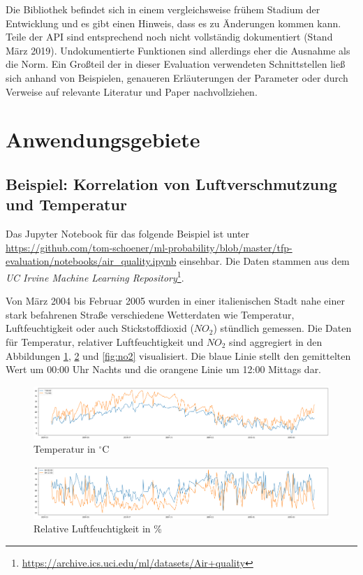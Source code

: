 \documentclass[12pt]{article}
\begin{document}
Die Bibliothek befindet sich in einem vergleichsweise frühem Stadium der Entwicklung und es gibt einen Hinweis, dass es zu Änderungen kommen kann. Teile der API sind entsprechend noch nicht vollständig dokumentiert (Stand März 2019).
Undokumentierte Funktionen sind allerdings eher die Ausnahme als die Norm. Ein Großteil der in dieser Evaluation verwendeten Schnittstellen ließ sich anhand von Beispielen, genaueren Erläuterungen der Parameter oder durch Verweise auf relevante Literatur und Paper nachvollziehen.

\section{Anwendungsgebiete}

\subsection{Beispiel: Korrelation von Luftverschmutzung und Temperatur}
\label{sec:example_air_quality}

Das Jupyter Notebook für das folgende Beispiel ist unter \url{https://github.com/tom-schoener/ml-probability/blob/master/tfp-evaluation/notebooks/air_quality.ipynb} einsehbar. Die Daten stammen aus dem \textit{UC Irvine Machine Learning Repository}\footnote{\url{https://archive.ics.uci.edu/ml/datasets/Air+quality}}.

Von März 2004 bis Februar 2005 wurden in einer italienischen Stadt nahe einer stark befahrenen Straße verschiedene Wetterdaten wie Temperatur, Luftfeuchtigkeit oder auch Stickstoffdioxid ($NO_2$) stündlich gemessen. Die Daten für Temperatur, relativer Luftfeuchtigkeit und $NO_2$ sind aggregiert in den Abbildungen \ref{fig:temp}, \ref{fig:rh} und \ref{fig:no2} visualisiert. Die blaue Linie stellt den gemittelten Wert um 00:00 Uhr Nachts und die orangene Linie um 12:00 Mittags dar.

\begin{figure}[h]
    \centering
    \includegraphics[width=1.0\textwidth]{./figs/temp.png}
    \caption{Temperatur in $^\circ\text{C}$}
    \label{fig:temp}
\end{figure}

\begin{figure}[h]
    \centering
    \includegraphics[width=1.0\textwidth]{./figs/rh.png}
    \caption{Relative Luftfeuchtigkeit in \%}
    \label{fig:rh}
\end{figure}
\end{document}
